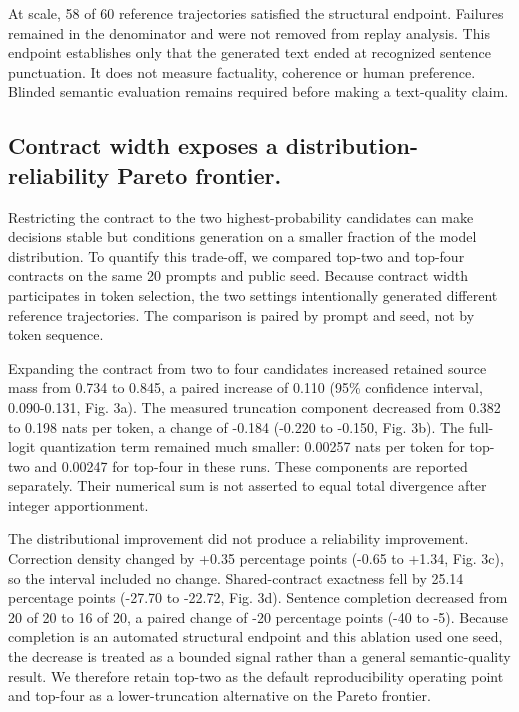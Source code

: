 \documentclass{nature}
\begin{document}
At scale, 58 of 60 reference trajectories satisfied the structural endpoint. Failures remained in the denominator and were not removed from replay analysis. This endpoint establishes only that the generated text ended at recognized sentence punctuation. It does not measure factuality, coherence or human preference. Blinded semantic evaluation remains required before making a text-quality claim.

\subsection{Contract width exposes a distribution-reliability Pareto frontier.}
Restricting the contract to the two highest-probability candidates can make decisions stable but conditions generation on a smaller fraction of the model distribution. To quantify this trade-off, we compared top-two and top-four contracts on the same 20 prompts and public seed. Because contract width participates in token selection, the two settings intentionally generated different reference trajectories. The comparison is paired by prompt and seed, not by token sequence.

Expanding the contract from two to four candidates increased retained source mass from 0.734 to 0.845, a paired increase of 0.110 (95\% confidence interval, 0.090-0.131, Fig. 3a). The measured truncation component decreased from 0.382 to 0.198 nats per token, a change of -0.184 (-0.220 to -0.150, Fig. 3b). The full-logit quantization term remained much smaller: 0.00257 nats per token for top-two and 0.00247 for top-four in these runs. These components are reported separately. Their numerical sum is not asserted to equal total divergence after integer apportionment.

The distributional improvement did not produce a reliability improvement. Correction density changed by +0.35 percentage points (-0.65 to +1.34, Fig. 3c), so the interval included no change. Shared-contract exactness fell by 25.14 percentage points (-27.70 to -22.72, Fig. 3d). Sentence completion decreased from 20 of 20 to 16 of 20, a paired change of -20 percentage points (-40 to -5). Because completion is an automated structural endpoint and this ablation used one seed, the decrease is treated as a bounded signal rather than a general semantic-quality result. We therefore retain top-two as the default reproducibility operating point and top-four as a lower-truncation alternative on the Pareto frontier.
\end{document}
